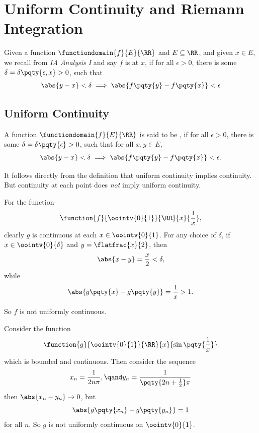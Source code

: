 \section{Uniform Continuity and Riemann Integration}

Given a function \(\functiondomain{f}{E}{\RR}\) and \(E \subseteq \RR\), and given \(x \in E\), we recall from \textit{IA Analysis I} and say \(f\) is  at \(x\), if for all \(\epsilon > 0\), there is some \(\delta = \delta\pqty{\epsilon, x} > 0\), such that
\[
    \abs{y - x} < \delta \implies \abs{f\pqty{y} - f\pqty{x}} < \epsilon
\]

\subsection{Uniform Continuity}

\begin{definition}
    A function \(\functiondomain{f}{E}{\RR}\) is said to be , if for all \(\epsilon > 0\), there is some \(\delta = \delta \pqty{\epsilon} > 0\), such that for all \(x, y \in E\),
    \[  
        \abs{y - x} < \delta \implies \abs{f\pqty{y} - f\pqty{x}} < \epsilon.
    \]
\end{definition}

It follows directly from the definition that uniform continuity implies continuity. But continuity at each point does \emph{not} imply uniform continuity.

\begin{example}
    For the function
    \[
        \function{f}{\oointv{0}{1}}{\RR}{x}{\frac{1}{x}},
    \]
    clearly \(g\) is continuous at each \(x \in \oointv{0}{1}\). For any choice of \(\delta\), if \(x \in \oointv{0}{\delta}\) and \(y = \flatfrac{x}{2}\), then
    \[
        \abs{x - y} = \frac{x}{2} < \delta,
    \]
    while
    \[
        \abs{g\pqty{x} - g\pqty{y}} = \frac{1}{x} > 1.
    \]

    So \(f\) is not uniformly continuous.
\end{example}

\begin{example}
    Consider the function
    \[
        \function{g}{\oointv{0}{1}}{\RR}{x}{\sin\pqty{\frac{1}{x}}}
    \]
    which is bounded and continuous. Then consider the sequence
    \[
        x_n = \frac{1}{2 n \pi}, \qand y_n = \frac{1}{\pqty{2n + \frac{1}{2}} \pi}
    \]
    then \(\abs{x_n - y_n} \to 0\), but
    \[
        \abs{g\pqty{x_n} - g\pqty{y_n}} = 1
    \]
    for all \(n\). So \(g\) is not uniformly continuous on \(\oointv{0}{1}\).
\end{example}


